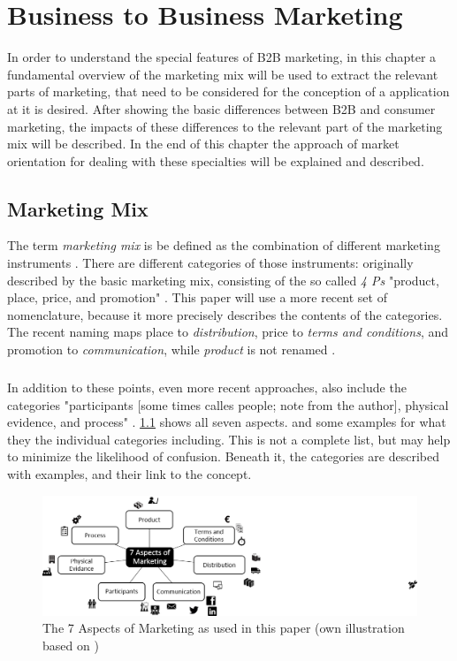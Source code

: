 \chapter{Business to Business Marketing}
In order to understand the special features of B2B marketing, in this chapter a fundamental overview of the marketing mix will be used to extract the relevant parts of marketing, that need to be considered for the conception of a application at it is desired. After showing the basic differences between B2B and consumer marketing, the impacts of these differences to the relevant part of the marketing mix will be described. In the end of this chapter the approach of market orientation for dealing with these specialties will be explained and described.
\section{Marketing Mix}
The term \textit{marketing mix} is be defined as the combination of different marketing instruments \parencite[see.][285]{Thommen.2012}. There are  different categories of those instruments: originally described by \textcite[see.][]{McCarthy.1993} the basic marketing mix, consisting of the so called \textit{4 Ps} "product, place, price, and promotion" . This paper will use a more recent set of nomenclature, because it more precisely describes the contents of the categories. The recent naming maps place to \textit{distribution}, price to \textit{terms and conditions}, and promotion to \textit{communication}, while \textit{product} is not renamed \parencites[285]{Thommen.2012}[see.][397-720]{Meffert.2015}. 
\paragraph*{} In addition to these points, even more recent approaches, also include the categories "participants [some times calles people; note from the author], physical evidence, and process" \parencite{Rafiq.1995}. \ref{fig:aspects} shows all seven aspects.  and some examples for what they the individual categories including. This is not a complete list, but may help to minimize the likelihood of confusion. Beneath it, the categories are described with examples, and their link to the concept.

\begin{figure}[H]
	\includegraphics[width=\textwidth]{img/7p.png}
	\caption[7 Aspects of Marketing]{The 7 Aspects of Marketing as used in this paper (own illustration based on \protect\cites[285]{Thommen2012}[397-720]{Meffert.2015}{Hoepner2015})}
	\label{fig:aspects}
\end{figure}

